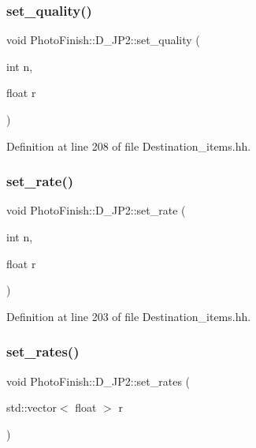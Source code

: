 \subsubsection{\texorpdfstring{set\+\_\+quality()}{set\_quality()}}
{\footnotesize\ttfamily void Photo\+Finish\+::\+D\+\_\+\+J\+P2\+::set\+\_\+quality (\begin{DoxyParamCaption}\item[{int}]{n,  }\item[{float}]{r }\end{DoxyParamCaption})\hspace{0.3cm}{\ttfamily [inline]}}



Definition at line 208 of file Destination\+\_\+items.\+hh.

\mbox{\label{class_photo_finish_1_1_d___j_p2_a0704300800c5413972531232266a50e5}} 
\subsubsection{\texorpdfstring{set\+\_\+rate()}{set\_rate()}}
{\footnotesize\ttfamily void Photo\+Finish\+::\+D\+\_\+\+J\+P2\+::set\+\_\+rate (\begin{DoxyParamCaption}\item[{int}]{n,  }\item[{float}]{r }\end{DoxyParamCaption})\hspace{0.3cm}{\ttfamily [inline]}}



Definition at line 203 of file Destination\+\_\+items.\+hh.

\mbox{\label{class_photo_finish_1_1_d___j_p2_a95a65c8461e7b2cadde20070c78a5ebb}} 
\subsubsection{\texorpdfstring{set\+\_\+rates()}{set\_rates()}}
{\footnotesize\ttfamily void Photo\+Finish\+::\+D\+\_\+\+J\+P2\+::set\+\_\+rates (\begin{DoxyParamCaption}\item[{std\+::vector$<$ float $>$}]{r }\end{DoxyParamCaption})\hspace{0.3cm}{\ttfamily [inline]}}



